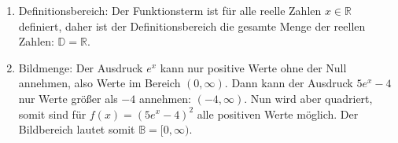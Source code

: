 \item
\begin{enumerate}
\item Definitionsbereich: Der Funktionsterm ist für alle reelle Zahlen $x \in \mathbb{R}$ definiert, daher ist der Definitionsbereich die gesamte Menge der reellen Zahlen: $\mathbb{D} = \mathbb{R}$.
\item Bildmenge: Der Ausdruck $e^x$ kann nur positive Werte ohne der Null annehmen, also Werte im Bereich $(0, \infty)$. Dann kann der Ausdruck $5e^x-4$ nur Werte größer als $-4$ annehmen: $(-4, \infty)$. Nun wird aber quadriert, somit sind für $f(x) = (5e^x-4)^2$ alle positiven Werte möglich.
Der Bildbereich lautet somit $\mathbb{B}=[0, \infty)$.
\end{enumerate}

